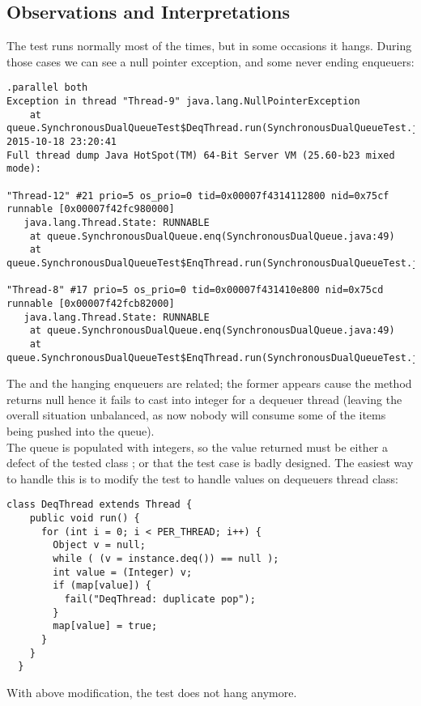 \subsection{Observations and Interpretations}
The test runs normally most of the times, but in some occasions it
hangs. During those cases we can see a null pointer exception, and
some never ending enqueuers:

\begin{verbatim}
.parallel both
Exception in thread "Thread-9" java.lang.NullPointerException
	at queue.SynchronousDualQueueTest$DeqThread.run(SynchronousDualQueueTest.java:67)
2015-10-18 23:20:41
Full thread dump Java HotSpot(TM) 64-Bit Server VM (25.60-b23 mixed mode):

"Thread-12" #21 prio=5 os_prio=0 tid=0x00007f4314112800 nid=0x75cf runnable [0x00007f42fc980000]
   java.lang.Thread.State: RUNNABLE
	at queue.SynchronousDualQueue.enq(SynchronousDualQueue.java:49)
	at queue.SynchronousDualQueueTest$EnqThread.run(SynchronousDualQueueTest.java:60)

"Thread-8" #17 prio=5 os_prio=0 tid=0x00007f431410e800 nid=0x75cd runnable [0x00007f42fcb82000]
   java.lang.Thread.State: RUNNABLE
	at queue.SynchronousDualQueue.enq(SynchronousDualQueue.java:49)
	at queue.SynchronousDualQueueTest$EnqThread.run(SynchronousDualQueueTest.java:60)
\end{verbatim}
\hfill

The  and the hanging enqueuers are related;
the former appears cause the  method returns null hence it
fails to cast into integer for a dequeuer thread (leaving the overall
situation unbalanced, as now nobody will consume some of the items
being pushed into the queue). \\

The queue is populated with integers, so the  value returned
must be either a defect of the tested class ;
or that the test case is badly designed. The easiest way to handle
this is to modify the test to handle  values on dequeuers
thread class: \\

\begin{lstlisting}[style=nonumbers]
  class DeqThread extends Thread {
    public void run() {
      for (int i = 0; i < PER_THREAD; i++) {
        Object v = null;
        while ( (v = instance.deq()) == null ); 
        int value = (Integer) v;
        if (map[value]) {
          fail("DeqThread: duplicate pop");
        }
        map[value] = true;
      }
    }
  }  
\end{lstlisting}
\hfill

With above modification, the test does not hang anymore.
